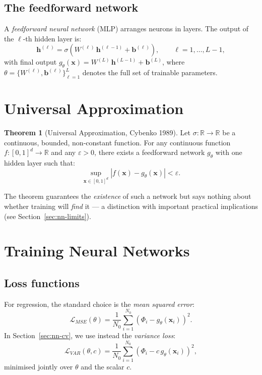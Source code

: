 \documentclass[12pt, a4paper]{report}
\theoremstyle{definition}
\newtheorem{theorem}{Theorem}[chapter]
\newcommand{\R}{\mathbb{R}}
\begin{document}
\subsection{The feedforward network}

A \emph{feedforward neural network} (MLP) arranges neurons in layers.
The output of the $\ell$-th hidden layer is:
\begin{equation}
    \mathbf{h}^{(\ell)} = \sigma\!\left(W^{(\ell)}\,\mathbf{h}^{(\ell-1)}
    + \mathbf{b}^{(\ell)}\right), \qquad \ell = 1, \ldots, L-1,
    \label{eq:hidden-layer}
\end{equation}
with final output $g_\theta(\mathbf{x}) = W^{(L)}\,\mathbf{h}^{(L-1)}
+ \mathbf{b}^{(L)}$, where
$\theta = \{W^{(\ell)}, \mathbf{b}^{(\ell)}\}_{\ell=1}^{L}$ denotes
the full set of trainable parameters.

\section{Universal Approximation}
\label{sec:ua}

\begin{theorem}[Universal Approximation, Cybenko 1989]
Let $\sigma : \R \to \R$ be a continuous, bounded, non-constant
function.  For any continuous function $f : [0,1]^d \to \R$ and any
$\varepsilon > 0$, there exists a feedforward network $g_\theta$ with
one hidden layer such that:
\begin{equation}
    \sup_{\mathbf{x} \in [0,1]^d}
    \left|f(\mathbf{x}) - g_\theta(\mathbf{x})\right| < \varepsilon.
    \label{eq:uat}
\end{equation}
\end{theorem}

The theorem guarantees the \emph{existence} of such a network but says
nothing about whether training will \emph{find} it --- a distinction
with important practical implications (see Section~\ref{sec:nn-limits}).

\section{Training Neural Networks}
\label{sec:training}

\subsection{Loss functions}

For regression, the standard choice is the \emph{mean squared error}:
\begin{equation}
    \mathcal{L}_{MSE}(\theta) = \frac{1}{N_0}\sum_{i=1}^{N_0}
    \left(\Phi_i - g_\theta(\mathbf{x}_i)\right)^2.
    \label{eq:mse-loss}
\end{equation}
In Section~\ref{sec:nn-cv}, we use instead the \emph{variance loss}:
\begin{equation}
    \mathcal{L}_{VAR}(\theta, c) = \frac{1}{N_0}\sum_{i=1}^{N_0}
    \left(\Phi_i - c\,g_\theta(\mathbf{x}_i)\right)^2,
    \label{eq:var-loss}
\end{equation}
minimised jointly over $\theta$ and the scalar $c$.
\end{document}
